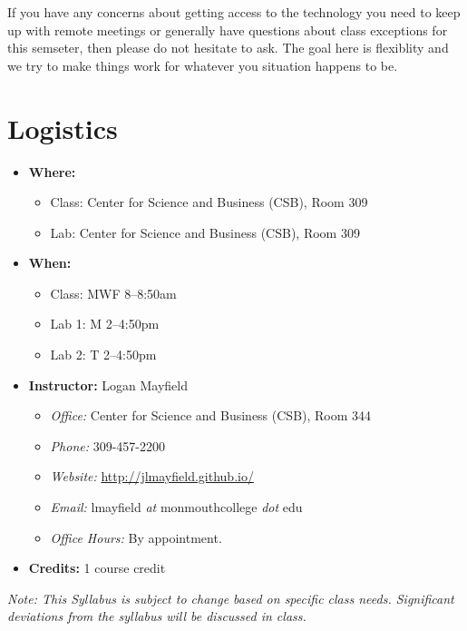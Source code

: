 \documentclass[10pt]{article}
\begin{document}
If you have any concerns about getting access to the technology you need to keep up with
remote meetings or generally have questions about class exceptions for this semseter,
then please do not hesitate to ask. The goal here is flexiblity and we try to make
things work for whatever you situation happens to be.


\section{Logistics}
\begin{itemize}
\item \textbf{Where: }
\begin{itemize}
\item Class: Center for Science and Business (CSB), Room 309\footnotemark[1]
\item Lab: Center for Science and Business (CSB), Room 309\footnotemark[1]
\end{itemize}
\item \textbf{When: }
\begin{itemize}
  \item Class: MWF 8--8:50am
  \item Lab 1: M 2--4:50pm
  \item Lab 2: T 2--4:50pm
\end{itemize}
\item \textbf{Instructor: } Logan Mayfield
\begin{itemize}
\item \textit{Office: } Center for Science and Business (CSB), Room 344\footnotemark[2]
\item \textit{Phone: } 309-457-2200 %
\item \textit{Website: } \url{http://jlmayfield.github.io/}
\item \textit{Email: } lmayfield \textit{at} monmouthcollege \textit{dot} edu
\item \textit{Office Hours: }  By appointment.
\end{itemize}
\item \textbf{Credits: } 1 course credit
\end{itemize}
\emph{Note: This Syllabus is subject to change based on specific class needs. Significant deviations from the syllabus will be discussed in class.}

\end{document}

